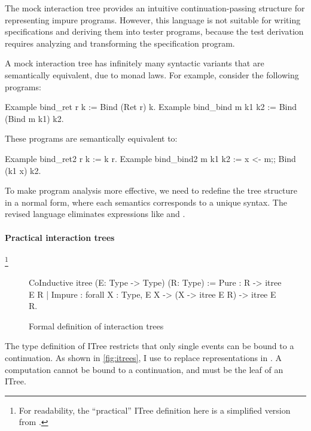 The mock interaction tree provides an intuitive continuation-passing structure
for representing impure programs.  However, this language is not suitable for
writing specifications and deriving them into tester programs, because the test
derivation requires analyzing and transforming the specification program.

A mock interaction tree has infinitely many syntactic variants that are
semantically equivalent, due to monad laws.  For example, consider the following
programs:
\begin{coq}
  Example bind_ret  r k     := Bind (Ret r) k.
  Example bind_bind m k1 k2 := Bind (Bind m k1) k2.
\end{coq}
These programs are semantically equivalent to:
\begin{coq}
  Example bind_ret2  r k     := k r.
  Example bind_bind2 m k1 k2 := x <- m;; Bind (k1 x) k2.
\end{coq}

To make program analysis more effective, we need to redefine the tree structure
in a normal form, where each semantics corresponds to a unique syntax.  The
revised language eliminates expressions like  and .

\paragraph{Practical interaction trees}
\footnote{For readability, the ``practical'' ITree definition here is a
  simplified version from \textcite{itree}.}
\begin{figure}
\begin{coq}
  CoInductive itree (E: Type -> Type) (R: Type) :=
    Pure   : R -> itree E R
  | Impure : forall {X : Type}, E X -> (X -> itree E R) -> itree E R.
\end{coq}
\caption{Formal definition of interaction trees}
\label{fig:itrees}
\end{figure}
The type definition of ITree restricts that only single events can be bound to a
continuation.  As shown in \autoref{fig:itrees}, I use  to
replace  representations in .  A
 computation cannot be bound to a continuation, and must be the leaf
of an ITree.

